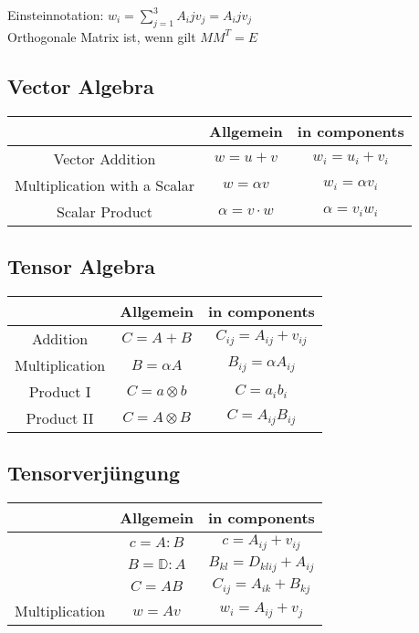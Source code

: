 \documentclass[a4paper]{scrartcl}
\begin{document}
Einsteinnotation: $w_i=\sum_{j=1}^{3}A_ijv_j=A_ijv_j$
\\
Orthogonale Matrix ist, wenn gilt $MM^T=E$
\\


\subsection{Vector Algebra}
\begin{tabular}{|c|c|c|}
\hline  & Allgemein & in components \\ 
\hline Vector Addition & $w=u+v$ & $w_i=u_i+v_i$ \\ 
\hline Multiplication with a Scalar & $w=\alpha v$ & $w_i=\alpha v_i$ \\ 
\hline Scalar Product & $\alpha = v \cdot w $ & $\alpha = v_i w_i$ \\ 
\hline 
\end{tabular} 

\subsection{Tensor Algebra}
\begin{tabular}{|c|c|c|}
\hline  & Allgemein & in components \\ 
\hline Addition & $C=A+B$ & $C_{ij}=A_{ij}+v_{ij}$ \\ 
\hline Multiplication& $B=\alpha A$ & $B_{ij}=\alpha A_{ij}$ \\ 
\hline Product I & $C = a \otimes b $ & $C = a_i b_i$ \\ 
\hline Product II& $C = A \otimes B $ & $C = A_{ij} B_{ij}$ \\
\hline 
\end{tabular} 

\subsection{Tensorverjüngung}
\begin{tabular}{|c|c|c|}
\hline  & Allgemein & in components \\ 
\hline  & $c=A:B$ & $c=A_{ij}+v_{ij}$ \\ 
\hline  & $B=\mathbb{D}:A$ & $B_{kl}=D_{klij}+A_{ij}$ \\
\hline  & $C=AB$ & $C_{ij}=A_{ik}+B_{kj}$ \\
\hline Multiplication & $w=Av$ & $w_i=A_{ij}+v_{j}$ \\
\hline 
\end{tabular} 
\end{document}
